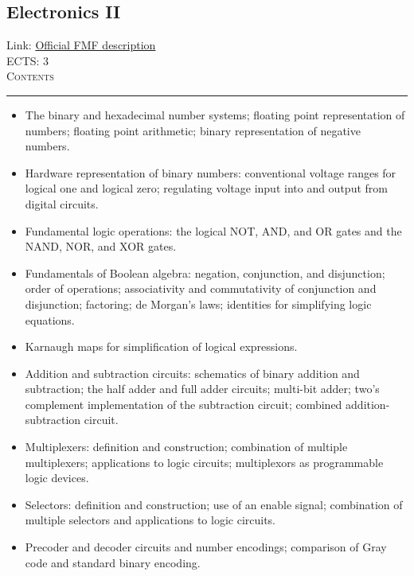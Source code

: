 \documentclass[11pt, a4paper]{article}
\newenvironment{course}[3]{
\subsection{#1}%
Link: \href{#2}{Official FMF description}\\%
ECTS: #3%
\vspace{1ex}
\\
{\large \textsc{Contents}}\\[-0.9ex]%
\rule{\textwidth}{0.5pt}
\vspace{-3ex}
}
{}
\newenvironment{chapter}[1]{
\begin{tcolorbox}[title=#1, breakable]
}
{\end{tcolorbox}}
\begin{document}
\begin{course}{Electronics II}{https://www.fmf.uni-lj.si/en/study-physics/programmes/1fiz/2020/7000777/courses/1135/}{3}
    \label{electronics_2}

    \begin{chapter}{Foundations of digital electronics}
        \begin{itemize}
        
            \item The binary and hexadecimal number systems; floating point representation of numbers; floating point arithmetic; binary representation of negative numbers.

            \item Hardware representation of binary numbers: conventional voltage ranges for logical one and logical zero; regulating voltage input into and output from digital circuits.

            \item Fundamental logic operations: the logical NOT, AND, and OR gates and the NAND, NOR, and XOR gates.

            \item Fundamentals of Boolean algebra: negation, conjunction, and disjunction; order of operations; associativity and commutativity of conjunction and disjunction; factoring; de Morgan's laws; identities for simplifying logic equations.

            \item Karnaugh maps for simplification of logical expressions.

            \item Addition and subtraction circuits: schematics of binary addition and subtraction; the half adder and full adder circuits; multi-bit adder; two's complement implementation of the subtraction circuit; combined addition-subtraction circuit.

            \item Multiplexers: definition and construction; combination of multiple multiplexers; applications to logic circuits; multiplexors as programmable logic devices.

            \item Selectors: definition and construction; use of an enable signal; combination of multiple selectors and applications to logic circuits.

            \item Precoder and decoder circuits and number encodings; comparison of Gray code and standard binary encoding.


\end{itemize}
\end{chapter}
\end{course}
\end{document}
